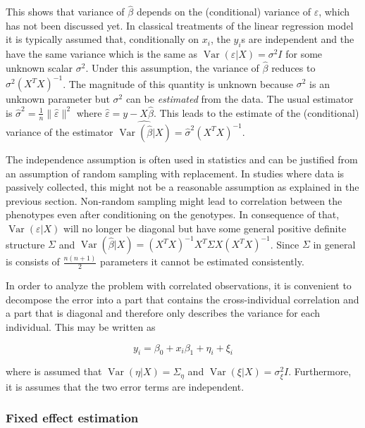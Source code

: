 \documentclass[review]{siamart0516}
\DeclareMathOperator{\Var}{Var}
\begin{document}
This shows that variance of $\hat{\beta}$ depends on the (conditional) variance of $\varepsilon$, which has not been discussed yet. In classical treatments of the linear regression model it is typically assumed that, conditionally on $x_i$, the $y_i$s are independent and the have the same variance which is the same as $\Var(\varepsilon|X)=\sigma^2 I$ for some unknown scalar $\sigma^2$. Under this assumption, the variance of $\hat{\beta}$ reduces to $\sigma^2 (X^TX)^{-1}$. The magnitude of this quantity is unknown because $\sigma^2$ is an unknown parameter but $\sigma^2$ can be \emph{estimated} from the data. The usual estimator is
$\hat{\sigma}^2=\frac{1}{n} \|\hat{\varepsilon}\|^2$
where $\hat{\varepsilon} = y - X\hat{\beta}$.
This leads to the estimate of the (conditional) variance of the estimator $\widehat{\Var(\hat{\beta}|X)} = \hat{\sigma}^2(X^TX)^{-1}$.

The independence assumption is often used in statistics and can be justified from an assumption of random sampling with replacement. In studies where data is passively collected, this might not be a reasonable assumption as explained in the previous section. Non-random sampling might lead to correlation between the phenotypes even after conditioning on the genotypes. In consequence of that, $\Var(\varepsilon|X)$ will no longer be diagonal but have some general positive definite structure $\Sigma$ and $\Var(\hat{\beta}|X)=(X^TX)^{-1}X^T\Sigma X(X^TX)^{-1}$. Since $\Sigma$ in general is consists of $\frac{n(n+1)}{2}$ parameters it cannot be estimated consistently.

In order to analyze the problem with correlated observations, it is convenient to decompose the error into a part that contains the cross-individual correlation and a part that is diagonal and therefore only describes the variance for each individual. This may be written as

\begin{equation*}
    y_i = \beta_0 + x_i\beta_1 + \eta_i + \xi_i
\end{equation*}

where is assumed that $\Var(\eta|X)=\Sigma_\eta$ and $\Var(\xi|X)=\sigma^2_\xi I$. Furthermore, it is assumes that the two error terms are independent.


\subsubsection{Fixed effect estimation}
\end{document}
